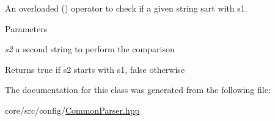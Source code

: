 An overloaded () operator to check if a given string sart with s1. 


\begin{DoxyParams}{Parameters}
\item[{\em s2}]a second string to perform the comparison \end{DoxyParams}
\begin{DoxyReturn}{Returns}
true if s2 starts with s1, false otherwise 
\end{DoxyReturn}


The documentation for this class was generated from the following file:\begin{DoxyCompactItemize}
\item 
core/src/config/\hyperlink{CommonParser_8hpp}{CommonParser.hpp}\end{DoxyCompactItemize}
